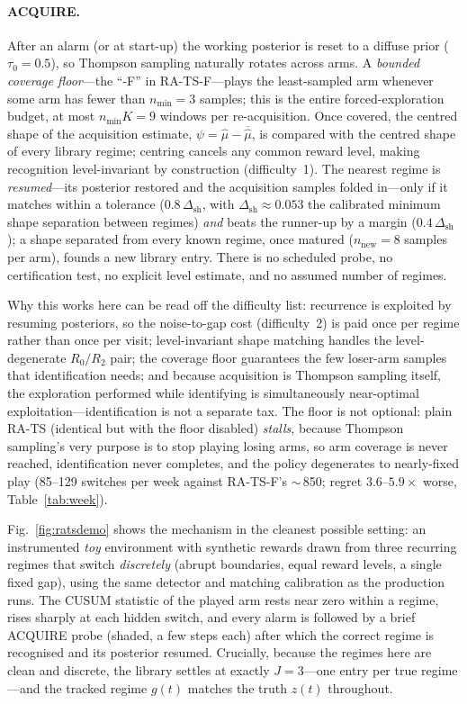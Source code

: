 \documentclass[11pt,a4paper]{article}
\begin{document}
\paragraph{ACQUIRE.} After an alarm (or at start-up) the working posterior is
reset to a diffuse prior ($\tau_0 = 0.5$), so Thompson sampling naturally
rotates across arms. A \emph{bounded coverage floor}---the ``-F'' in
RA-TS-F---plays the least-sampled arm whenever some arm has fewer than
$n_{\min}=3$ samples; this is the entire forced-exploration budget, at most
$n_{\min}K = 9$ windows per re-acquisition. Once covered, the centred shape of
the acquisition estimate, $\psi = \hat\mu - \overline{\hat\mu}$, is compared
with the centred shape of every library regime; centring cancels any common
reward level, making recognition level-invariant by construction
(difficulty~1). The nearest regime is \emph{resumed}---its posterior restored
and the acquisition samples folded in---only if it matches within a tolerance
($0.8\,\Delta_{\mathrm{sh}}$, with $\Delta_{\mathrm{sh}} \approx 0.053$ the
calibrated minimum shape separation between regimes) \emph{and} beats the
runner-up by a margin ($0.4\,\Delta_{\mathrm{sh}}$); a shape separated from
every known regime, once matured ($n_{\mathrm{new}}=8$ samples per arm),
founds a new library entry. There is no scheduled probe, no certification
test, no explicit level estimate, and no assumed number of regimes.

Why this works here can be read off the difficulty list: recurrence is
exploited by resuming posteriors, so the noise-to-gap cost (difficulty~2) is
paid once per regime rather than once per visit; level-invariant shape matching
handles the level-degenerate $R_0/R_2$ pair; the coverage floor guarantees the
few loser-arm samples that identification needs; and because acquisition is
Thompson sampling itself, the exploration performed while identifying is
simultaneously near-optimal exploitation---identification is not a separate
tax. The floor is not optional: plain RA-TS (identical but with the floor disabled)
\emph{stalls}, because Thompson sampling's very purpose is to stop playing
losing arms, so arm coverage is never reached, identification never completes,
and the policy degenerates to nearly-fixed play (85--129 switches per week
against RA-TS-F's $\sim$\,850; regret $3.6$--$5.9\times$ worse,
Table~\ref{tab:week}).

Fig.~\ref{fig:ratsdemo} shows the mechanism in the cleanest possible setting:
an instrumented \emph{toy} environment with synthetic rewards drawn from three
recurring regimes that switch \emph{discretely} (abrupt boundaries, equal
reward levels, a single fixed gap), using the same detector and matching
calibration as the production runs. The CUSUM statistic of the played arm rests
near zero within a regime, rises sharply at each hidden switch, and every alarm
is followed by a brief ACQUIRE probe (shaded, a few steps each) after which the
correct regime is recognised and its posterior resumed. Crucially, because the
regimes here are clean and discrete, the library settles at exactly $J=3$---one
entry per true regime---and the tracked regime $g(t)$ matches the truth $z(t)$
throughout.
\end{document}
